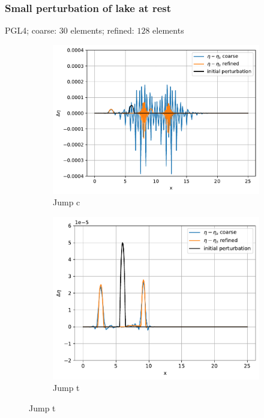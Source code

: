 \documentclass[pt12]{beamer}
\begin{document}
\begin{frame}
\frametitle{Small perturbation of lake at rest}
\centering
{\small PGL4; coarse: $30$ elements; refined: $128$ elements}
\begin{figure}
     \centering
     \begin{subfigure}[b]{0.3\textwidth}
         \centering
         \includegraphics[width=\textwidth]{alb_latr_WBp3s14jc.pdf}
         \caption{Jump c}
     \end{subfigure}
     \begin{subfigure}[b]{0.3\textwidth}
         \centering
         \includegraphics[width=\textwidth]{alb_latr_WBp3s14jt.pdf}
         \caption{Jump t}
     \end{subfigure}

\end{figure}
\end{frame}
\end{document}
